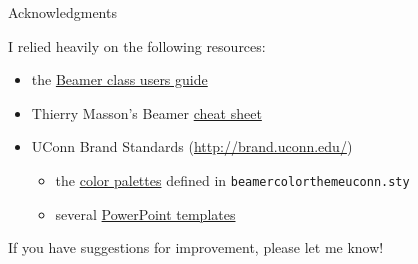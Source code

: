 \documentclass{beamer}
\begin{document}
\begin{frame}{Acknowledgments}
\label{slide:acknowledgments}

I relied heavily on the following resources:
\begin{itemize}
\item the \href{http://texdoc.net/texmf-dist/doc/latex/beamer/doc/beameruserguide.pdf}{Beamer class users guide}
\item Thierry Masson's Beamer \href{http://www.cpt.univ-mrs.fr/~masson/latex/Beamer-appearance-cheat-sheet.pdf}{cheat sheet}
\item UConn Brand Standards (\url{http://brand.uconn.edu/})
\begin{itemize}
\item the \href{http://brand.uconn.edu/standards/color-palette/}{color palettes} defined in {\tt beamercolorthemeuconn.sty}
\item several \href{http://brand.uconn.edu/resources/powerpoint-templates/}{PowerPoint templates}
\end{itemize}
\end{itemize}

\vfill
If you have suggestions for improvement, please let me know!

\center\href{mailto:cornelioid@gmail.com}{}

\end{frame}
\end{document}
